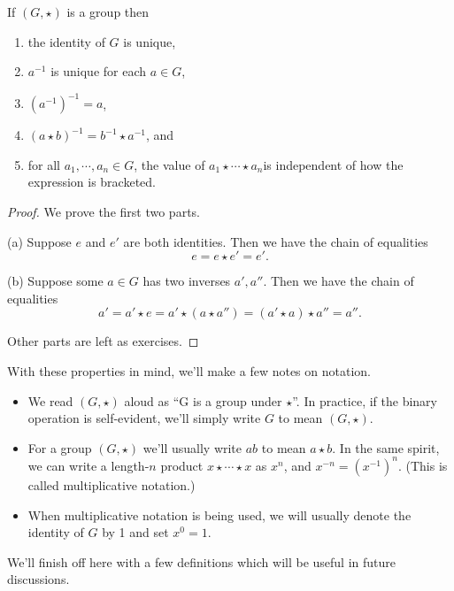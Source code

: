 \documentclass[../m171main.tex]{subfiles}
\begin{document}
\begin{theorem}[]       %
    If $(G, \star)$ is a group then
    \begin{enumerate}[label=(\alph*)]
        \item the identity of $G$ is unique,
        \item $a^{-1}$ is unique for each $a \in G$,
        \item $(a^{-1})^{-1} = a$,
        \item $(a \star b)^{-1} = b^{-1} \star a^{-1}$, and
        \item for all $a_1, \cdots, a_n \in G$, the value of $a_1 \star \cdots \star a_n$is independent of how the expression is bracketed.
    \end{enumerate}
\end{theorem}

\begin{proof}
    We prove the first two parts.
    
    (a) Suppose $e$ and $e'$ are both identities.
    Then we have the chain of equalities
    \[ e = e \star e' = e'. \]

    (b) Suppose some $a \in G$ has two inverses $a', a''$.
    Then we have the chain of equalities
    \[ a' = a' \star e = a' \star (a \star a'') = (a' \star a) \star a'' = a''. \]

    Other parts are left as exercises.
\end{proof}

With these properties in mind, we'll make a few notes on notation.
\begin{itemize}
    \item We read $(G, \star)$ aloud as ``G is a group under $\star$''.
    In practice, if the binary operation is self-evident, we'll simply write $G$ to mean $(G, \star)$.

    \item For a group $(G, \star)$ we'll usually write $ab$ to mean $a \star b$.
    In the same spirit, we can write a length-$n$ product $x \star \cdots \star x$ as $x^{n}$, and $x^{-n} = \left( x^{-1} \right)^{n}$.
    (This is called multiplicative notation.)

    \item When multiplicative notation is being used, we will usually denote the identity of $G$ by 1 and set $x^{0} = 1$.
\end{itemize}
We'll finish off here with a few definitions which will be useful in future discussions.
\end{document}
